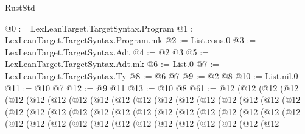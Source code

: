\begin{lexlean}{RustStd}
\begin{coremodule}
@0 := LexLeanTarget.TargetSyntax.Program
@1 := LexLeanTarget.TargetSyntax.Program.mk
@2 := List.cons.{0}
@3 := LexLeanTarget.TargetSyntax.Adt
@4 := @2 @3
@5 := LexLeanTarget.TargetSyntax.Adt.mk
@6 := List.{0}
@7 := LexLeanTarget.TargetSyntax.Ty
@8 := @6 @7
@9 := @2 @8
@10 := List.nil.{0}
@11 := @10 @7
@12 := @9 @11
@13 := @10 @8
@61 := @12
    (@12
      (@12
        (@12
          (@12
            (@12
              (@12
                (@12
                  (@12
                    (@12
                      (@12
                        (@12
                          (@12
                            (@12
                              (@12
                                (@12
                                  (@12
                                    (@12
                                      (@12
                                        (@12
                                          (@12
                                            (@12
                                              (@12
                                                (@12
                                                  (@12
                                                    (@12
                                                      (@12
                                                        (@12
                                                          (@12
                                                            (@12
                                                              (@12
                                                                (@12
                                                                  (@12
                                                                    (@12
                                                                      (@12
                                                                        (@12
                                                                          (@12
                                                                            (@12
                                                                              (@12
                                                                                (@12
                                                                                  (@12
                                                                                    (@12
                                                                                      (@12
                                                                                        (@12
                                                                                          (@12

\end{coremodule}
\end{lexlean}
